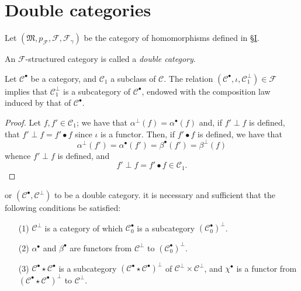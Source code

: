\documentclass[a4paper,fleqn]{article}
\theoremstyle{plain}
\newenvironment{proposition}[1]
  {\renewcommand\theinnerproposition{#1}\innerproposition}
  {\endinnerproposition}
\newenvironment{corollary}[1]
  {\renewcommand\theinnercorollary{#1}\innercorollary}
  {\endinnercorollary}
\theoremstyle{definition}
\newenvironment{definition}[1]
  {\renewcommand\theinnerdefinition{#1}\innerdefinition}
  {\endinnerdefinition}
\newcommand{\CC}{\mathcal{C}}
\newcommand{\MM}{\mathfrak{M}}
\newcommand{\FF}{\mathcal{F}}
\begin{document}
\section{Double categories}
\label{section:ii-4}

Let $(\MM,p_\FF,\FF,\FF_\gamma)$ be the category of homomorphisms defined in \hyperref[section:i]{§I}.

\begin{definition}{10}
\label{definition:ii-10}
  An $\FF$-structured category is called a \emph{double category}.
\end{definition}

\begin{proposition}{9}
\label{proposition:ii-9}
  Let $\CC^\bullet$ be a category, and $\CC_1$ a subclass of $\CC$.
  The relation $(\CC^\bullet,\iota,\CC_1^\perp)\in\FF$ implies that $\CC_1^\perp$ is a subcategory of $\CC^\bullet$, endowed with the composition law induced by that of $\CC^\bullet$.
\end{proposition}

\begin{proof}
  Let $f,f'\in\CC_1$;
  we have that $\alpha^\perp(f)=\alpha^\bullet(f)$ and, if $f'\perp f$ is defined, that $f'\perp f=f'\bullet f$ since $\iota$ is a functor.
  Then, if $f'\bullet f$ is defined, we have that
  \[
    \alpha^\perp(f')
    = \alpha^\bullet(f')
    = \beta^\bullet(f')
    = \beta^\perp(f)
  \]
  whence $f'\perp f$ is defined, and
  \[
    f'\perp f
    = f'\bullet f
    \in\CC_1.
  \]
\end{proof}

\begin{corollary}
  For $(\CC^\bullet,\CC^\perp)$ to be a double category. it is necessary and sufficient that the following conditions be satisfied:
  \begin{enumerate}
    \item[\normalfont(1)]
      $\CC^\perp$ is a category of which $\CC_0^\bullet$ is a subcategory $(\CC_0^\bullet)^\perp$.
    \item[\normalfont(2)]
      $\alpha^\bullet$ and $\beta^\bullet$ are functors from $\CC^\perp$ to $(\CC_0^\bullet)^\perp$.
    \item[\normalfont(3)]
      $\CC^\bullet\star\CC^\bullet$ is a subcategory $(\CC^\bullet\star\CC^\bullet)^\perp$ of $\CC^\perp\times\CC^\perp$, and $\chi^\bullet$ is a functor from $(\CC^\bullet\star\CC^\bullet)^\perp$ to $\CC^\perp$.
  \end{enumerate}
\end{corollary}
\end{document}
